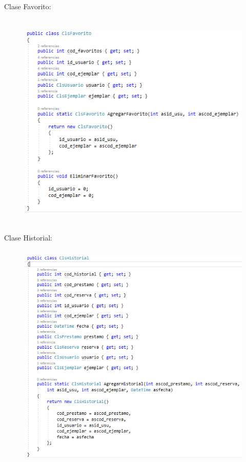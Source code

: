 \documentclass[12pt]{article}
\begin{document}
\begin{enumerate}[label*=\arabic*.]
\begin{enumerate}[label*=\arabic*.]
\newpage
Clase Favorito:
\begin{figure}[H]
	\begin{Center}
		\includegraphics[width=4.91in,height=4.15in]{./media/6.png}
	\end{Center}
\end{figure}


Clase Historial:
\begin{figure}[H]
	\begin{Center}
		\includegraphics[width=4.91in,height=4.35in]{./media/7.png}
	\end{Center}
\end{figure}


\end{enumerate}
\end{enumerate}
\end{document}
